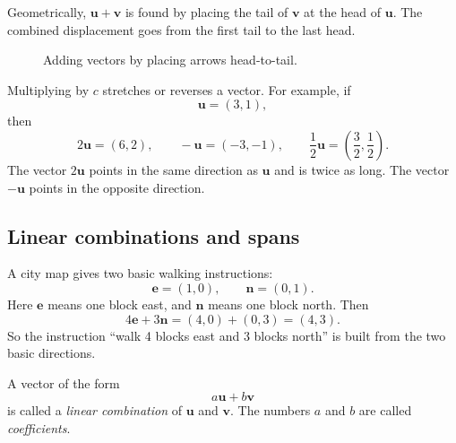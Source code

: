 Geometrically, \(\mathbf u+\mathbf v\) is found by placing the tail of \(\mathbf v\)
at the head of \(\mathbf u\).  The combined displacement goes from the first tail to
the last head.

\begin{figure}[h]
\centering
{}
\caption{Adding vectors by placing arrows head-to-tail.}
\end{figure}

Multiplying by \(c\) stretches or reverses a vector.  For example, if
\[
    \mathbf u=(3,1),
\]
then
\[
    2\mathbf u=(6,2), \qquad -\mathbf u=(-3,-1), \qquad \frac12\mathbf u=\left(\frac32,\frac12\right).
\]
The vector \(2\mathbf u\) points in the same direction as \(\mathbf u\) and is twice
as long.  The vector \(-\mathbf u\) points in the opposite direction.

\subsection{Linear combinations and spans}

A city map gives two basic walking instructions:
\[
    \mathbf e=(1,0), \qquad \mathbf n=(0,1).
\]
Here \(\mathbf e\) means one block east, and \(\mathbf n\) means one block north.
Then
\[
    4\mathbf e+3\mathbf n=(4,0)+(0,3)=(4,3).
\]
So the instruction ``walk 4 blocks east and 3 blocks north'' is built from the two
basic directions.

\begin{definition}
A vector of the form
\[
    a\mathbf u+b\mathbf v
\]
is called a \emph{linear combination} of \(\mathbf u\) and \(\mathbf v\).  The numbers
\(a\) and \(b\) are called \emph{coefficients}.
\end{definition}

